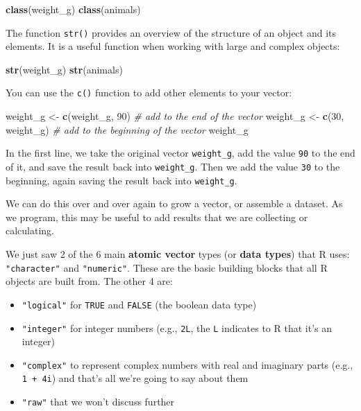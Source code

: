 \documentclass[]{book}
\newenvironment{Shaded}{\begin{snugshade}}{\end{snugshade}}
\newcommand{\KeywordTok}[1]{\textcolor[rgb]{0.13,0.29,0.53}{\textbf{#1}}}
\newcommand{\DecValTok}[1]{\textcolor[rgb]{0.00,0.00,0.81}{#1}}
\newcommand{\StringTok}[1]{\textcolor[rgb]{0.31,0.60,0.02}{#1}}
\newcommand{\CommentTok}[1]{\textcolor[rgb]{0.56,0.35,0.01}{\textit{#1}}}
\newcommand{\NormalTok}[1]{#1}
\providecommand{\tightlist}{%
  \setlength{\itemsep}{0pt}\setlength{\parskip}{0pt}}
\theoremstyle{definition}
\theoremstyle{definition}
\theoremstyle{remark}
\begin{document}
\begin{Shaded}
\begin{Highlighting}[]
\KeywordTok{class}\NormalTok{(weight_g)}
\KeywordTok{class}\NormalTok{(animals)}
\end{Highlighting}
\end{Shaded}

The function \texttt{str()} provides an overview of the structure of an
object and its elements. It is a useful function when working with large
and complex objects:

\begin{Shaded}
\begin{Highlighting}[]
\KeywordTok{str}\NormalTok{(weight_g)}
\KeywordTok{str}\NormalTok{(animals)}
\end{Highlighting}
\end{Shaded}

You can use the \texttt{c()} function to add other elements to your
vector:

\begin{Shaded}
\begin{Highlighting}[]
\NormalTok{weight_g <-}\StringTok{ }\KeywordTok{c}\NormalTok{(weight_g, }\DecValTok{90}\NormalTok{) }\CommentTok{# add to the end of the vector}
\NormalTok{weight_g <-}\StringTok{ }\KeywordTok{c}\NormalTok{(}\DecValTok{30}\NormalTok{, weight_g) }\CommentTok{# add to the beginning of the vector}
\NormalTok{weight_g}
\end{Highlighting}
\end{Shaded}

In the first line, we take the original vector \texttt{weight\_g}, add
the value \texttt{90} to the end of it, and save the result back into
\texttt{weight\_g}. Then we add the value \texttt{30} to the beginning,
again saving the result back into \texttt{weight\_g}.

We can do this over and over again to grow a vector, or assemble a
dataset. As we program, this may be useful to add results that we are
collecting or calculating.

We just saw 2 of the 6 main \textbf{atomic vector} types (or
\textbf{data types}) that R uses: \texttt{"character"} and
\texttt{"numeric"}. These are the basic building blocks that all R
objects are built from. The other 4 are:

\begin{itemize}
\tightlist
\item
  \texttt{"logical"} for \texttt{TRUE} and \texttt{FALSE} (the boolean
  data type)
\item
  \texttt{"integer"} for integer numbers (e.g., \texttt{2L}, the
  \texttt{L} indicates to R that it's an integer)
\item
  \texttt{"complex"} to represent complex numbers with real and
  imaginary parts (e.g., \texttt{1\ +\ 4i}) and that's all we're going
  to say about them
\item
  \texttt{"raw"} that we won't discuss further
\end{itemize}
\end{document}
